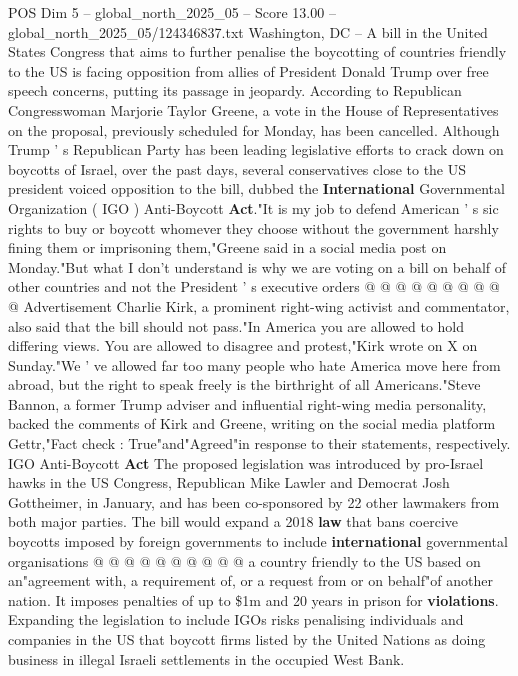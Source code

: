 \begin{textsample}{POS Dim 5 – global\_north\_2025\_05 – Score 13.00 – global\_north\_2025\_05/124346837.txt}  \label{ex:f5_pos_139}
Washington, DC -- A bill in the United States Congress that aims to further penalise the boycotting of countries friendly to the US is facing opposition from allies of President Donald Trump over free speech concerns, putting its passage in jeopardy.
According to Republican Congresswoman Marjorie Taylor Greene, a vote in the House of Representatives on the proposal, previously scheduled for Monday, has been cancelled.
Although Trump ' s Republican Party has been leading legislative efforts to crack down on boycotts of Israel, over the past days, several conservatives close to the US president voiced opposition to the bill, dubbed the \textbf{International} Governmental Organization ( IGO ) Anti-Boycott \textbf{Act}."It is my job to defend American ' s sic rights to buy or boycott whomever they choose without the government harshly fining them or imprisoning them,"Greene said in a social media post on Monday."But what I don't understand is why we are voting on a bill on behalf of other countries and not the President ' s executive orders @ @ @ @ @ @ @ @ @ @ Advertisement Charlie Kirk, a prominent right-wing activist and commentator, also said that the bill should not pass."In America you are allowed to hold differing views.
You are allowed to disagree and protest,"Kirk wrote on X on Sunday."We ' ve allowed far too many people who hate America move here from abroad, but the right to speak freely is the birthright of all Americans."Steve Bannon, a former Trump adviser and influential right-wing media personality, backed the comments of Kirk and Greene, writing on the social media platform Gettr,"Fact check : True"and"Agreed"in response to their statements, respectively.
IGO Anti-Boycott \textbf{Act} The proposed legislation was introduced by pro-Israel hawks in the US Congress, Republican Mike Lawler and Democrat Josh Gottheimer, in January, and has been co-sponsored by 22 other lawmakers from both major parties.
The bill would expand a 2018 \textbf{law} that bans coercive boycotts imposed by foreign governments to include \textbf{international} governmental organisations @ @ @ @ @ @ @ @ @ @ a country friendly to the US based on an"agreement with, a requirement of, or a request from or on behalf"of another nation.
It imposes penalties of up to \$1m and 20 years in prison for \textbf{violations}.
Expanding the legislation to include IGOs risks penalising individuals and companies in the US that boycott firms listed by the United Nations as doing business in illegal Israeli settlements in the occupied West Bank.

\end{textsample}
